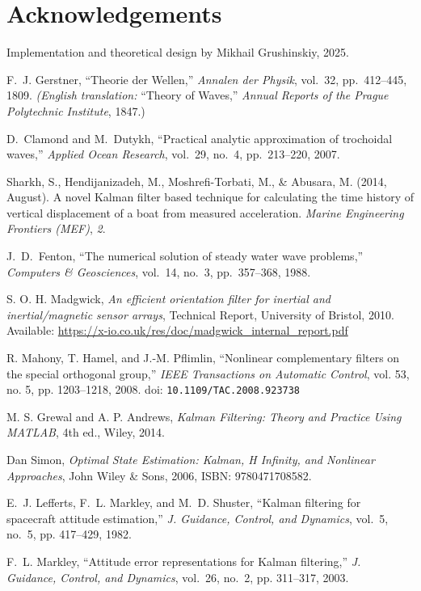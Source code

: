 \documentclass[11pt,letterpaper]{article}
\begin{document}
\section*{Acknowledgements}
Implementation and theoretical design by Mikhail Grushinskiy, 2025.

\begin{thebibliography}{4}

F.~J. Gerstner, ``Theorie der Wellen,'' 
\emph{Annalen der Physik}, vol.~32, pp.~412–445, 1809.  
\emph{(English translation: }``Theory of Waves,'' \emph{Annual Reports of the Prague Polytechnic Institute}, 1847.)

D.~Clamond and M.~Dutykh, ``Practical analytic approximation of trochoidal waves,'' 
\emph{Applied Ocean Research}, vol.~29, no.~4, pp.~213–220, 2007.

Sharkh, S., Hendijanizadeh, M., Moshrefi-Torbati, M., \& Abusara, M. (2014, August). 
A novel Kalman filter based technique for calculating the time history of vertical displacement of a boat from measured acceleration. 
\textit{Marine Engineering Frontiers (MEF)}, \textit{2}.

J.~D.~Fenton, “The numerical solution of steady water wave problems,” \emph{Computers \& Geosciences}, vol.~14, no.~3, pp.~357–368, 1988.

S. O. H. Madgwick,  
\textit{An efficient orientation filter for inertial and inertial/magnetic sensor arrays},  
Technical Report, University of Bristol, 2010.  
Available: \url{https://x-io.co.uk/res/doc/madgwick_internal_report.pdf}

R. Mahony, T. Hamel, and J.-M. Pflimlin,  
``Nonlinear complementary filters on the special orthogonal group,''  
\textit{IEEE Transactions on Automatic Control}, vol. 53, no. 5, pp. 1203--1218, 2008.  
doi: \texttt{10.1109/TAC.2008.923738}

M. S. Grewal and A. P. Andrews,  
\textit{Kalman Filtering: Theory and Practice Using MATLAB},  
4th ed., Wiley, 2014.

Dan Simon,
\textit{Optimal State Estimation: Kalman, H Infinity, and Nonlinear Approaches},
John Wiley \& Sons, 2006,
ISBN: 9780471708582.

E.~J. Lefferts, F.~L. Markley, and M.~D. Shuster, “Kalman filtering for spacecraft attitude estimation,” \emph{J. Guidance, Control, and Dynamics}, vol.~5, no.~5, pp. 417–429, 1982.

F.~L. Markley, “Attitude error representations for Kalman filtering,” \emph{J. Guidance, Control, and Dynamics}, vol.~26, no.~2, pp. 311–317, 2003.

\end{thebibliography}
\end{document}

